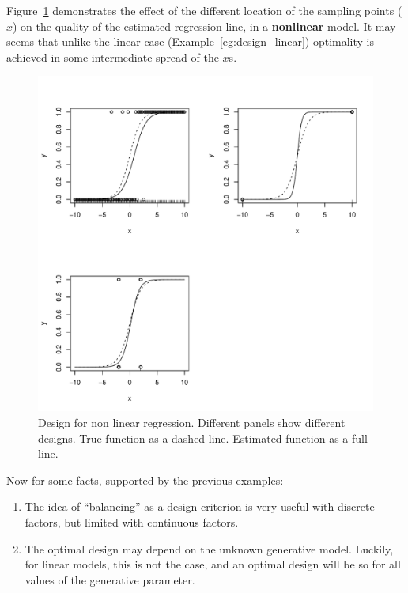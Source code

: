 \begin{example}
\label{eg:design_non_linear}
Figure~\ref{fig:design_nonlinear} demonstrates the effect of the different location of the sampling points ($x$) on the quality of the estimated regression line, in a \textbf{nonlinear} model.
It may seems that unlike the linear case (Example~\ref{eg:design_linear}) optimality is achieved in some intermediate spread of the $x$s.
\begin{figure}[ht]
\centering
\includegraphics[height=0.3\textheight]{art/nonlinear}
\caption[Design for Non Linear Models]{Design for non linear regression. Different panels show different designs. True function as a dashed line. Estimated function as a full line.}
\label{fig:design_nonlinear}
\end{figure}
\end{example}





Now for some facts, supported by the previous examples:
\begin{enumerate}
\item The idea of ``balancing'' as a design criterion is very useful with discrete factors, but limited with continuous factors. 
\item The optimal design may depend on the unknown generative model. Luckily, for linear models, this is not the case, and an optimal design will be so for all values of the generative parameter.
\end{enumerate}



